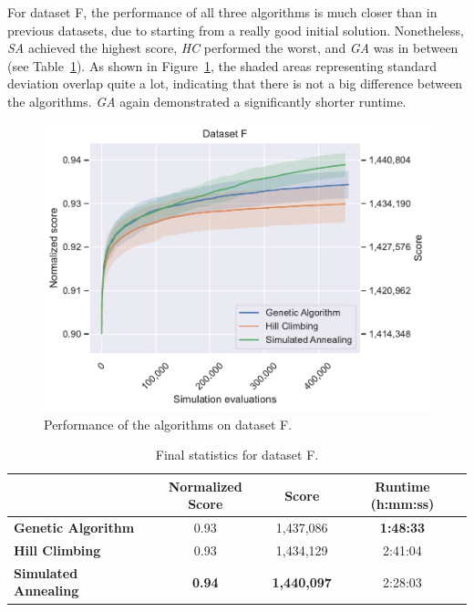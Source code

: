 For dataset F, the performance of all three algorithms is much closer than in previous datasets, due to starting from a really good initial solution. Nonetheless, \textit{SA} achieved the highest score, \textit{HC} performed the worst, and \textit{GA} was in between (see Table~\ref{tab:dataset_f_results}). As shown in Figure~\ref{fig:dataset_f_experiment}, the shaded areas representing standard deviation overlap quite a lot, indicating that there is not a big difference between the algorithms. \textit{GA} again demonstrated a significantly shorter runtime.

\bigskip

\begin{figure}[h]
    \centering
    \includegraphics[width=\linewidth]{img/experiments/f_Genetic Algorithm_Hill Climbing_Simulated Annealing.pdf}
    \caption[Performance of the algorithms on dataset F]{
        Performance of the algorithms on dataset F.
    }
    \label{fig:dataset_f_experiment}
\end{figure}

\bigskip

\begin{table}[h]
\centering\footnotesize\sf
\begin{tabular}{lccc}
\toprule
& Normalized Score & Score & Runtime (h:mm:ss) \\
\midrule
\textcolor{myblue}{\textbf{Genetic Algorithm}} & 0.93 & 1,437,086 & \textbf{1:48:33} \\
\textcolor{myorange}{\textbf{Hill Climbing}} & 0.93 & 1,434,129 & 2:41:04 \\
\textcolor{mygreen}{\textbf{Simulated Annealing}} & \textbf{0.94} & \textbf{1,440,097} & 2:28:03 \\
\bottomrule
\end{tabular}
\caption[Statistics for dataset F]{
    Final statistics for dataset F.
}
\label{tab:dataset_f_results}
\end{table}

